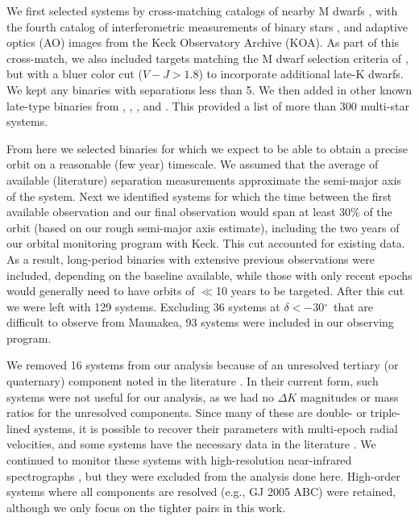 \documentclass[twocolumn]{aastex62}
\newcommand{\degree}{$^{\circ}$}
\begin{document}
We first selected systems by cross-matching catalogs of nearby M dwarfs \citep{Lepine:2013, Gaidos2014, 2014ApJ...784..156D,Winters2015}, with the fourth catalog of interferometric measurements of binary stars \citep[INT4,][]{Hartkopf:2001}, and adaptive optics (AO) images from the Keck Observatory Archive (KOA). As part of this cross-match, we also included targets matching the M dwarf selection criteria of \citet{Gaidos2014}, but with a bluer color cut ($V-J>1.8$) to incorporate additional late-K dwarfs. We kept any binaries with separations less than 5\arcsec. We then added in other known late-type binaries from \citet{2008MNRAS.384..150L}, \citet{Jnn2012}, \citet{Jnn2014}, and \citet{Ward-Duong2015}. This provided a list of more than 300 multi-star systems.

From here we selected binaries for which we expect to be able to obtain a precise orbit on a reasonable (few year) timescale. We assumed that the average of available (literature) separation measurements approximate the semi-major axis of the system. Next we identified systems for which the time between the first available observation and our final observation would span at least 30\% of the orbit (based on our rough semi-major axis estimate), including the two years of our orbital monitoring program with Keck. This cut accounted for existing data. As a result, long-period binaries with extensive previous observations were included, depending on the baseline available, while those with only recent epochs would generally need to have orbits of $\ll$10 years to be targeted. After this cut we were left with 129 systems. Excluding 36 systems at $\delta<-30$\degree\ that are difficult to observe from Maunakea, 93 systems were included in our observing program.

We removed 16 systems from our analysis because of an unresolved tertiary (or quaternary) component noted in the literature \citep[e.g.,][]{2010ApJ...720.1727L,2002A&A...382..118T,2018ApJS..235....6T}. In their current form, such systems were not useful for our analysis, as we had no $\Delta K$ magnitudes or mass ratios for the unresolved components. Since many of these are double- or triple-lined systems, it is possible to recover their parameters with multi-epoch radial velocities, and some systems have the necessary data in the literature \citep[e.g.,][]{Sgr2000}. We continued to monitor these systems with high-resolution near-infrared spectrographs \citep{2010SPIE.7735E..1MY, 2012SPIE.8446E..2CR, Park2014}, but they were excluded from the analysis done here. High-order systems where all components are resolved (e.g., GJ 2005 ABC) were retained, although we only focus on the tighter pairs in this work. 
\end{document}
